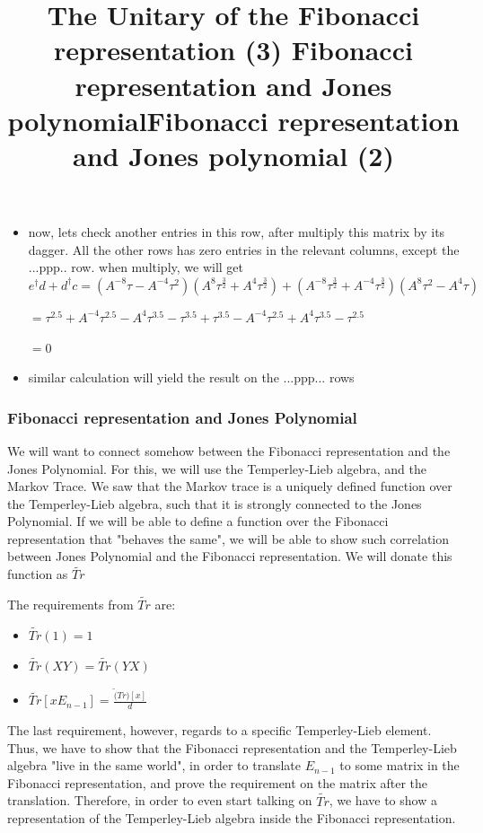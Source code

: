 \documentclass{article}
\begin{document}
\title{The Unitary of the Fibonacci representation (3) }
\begin{itemize}
\item  now, lets check another entries in this row, after multiply this matrix by its dagger.
All the other rows has zero entries in the relevant columns, except the ...ppp.. row. when multiply, we will get $e^{\dagger}d + d^{\dagger}c = (A^{-8}\tau - A^{-4}\tau^{2})(A^{8}\tau^{\frac{3}{2}} + A^{4}\tau^{\frac{3}{2}}) + (A^{-8}\tau^{\frac{3}{2}} + A^{-4}\tau^{\frac{3}{2}})(A^{8}\tau^{2} - A^{4}\tau)$

$ = \tau^{2.5} + A^{-4}\tau^{2.5} - A^{4}\tau^{3.5} - \tau^{3.5} + \tau^{3.5} - A^{-4}\tau^{2.5} + A^{4}\tau^{3.5} - \tau^{2.5}$

$ = 0$
\item similar calculation will yield the result on the ...ppp... rows   
\end{itemize}

\subsubsection{Fibonacci representation and Jones Polynomial}
\title{Fibonacci representation and Jones polynomial}
We will want to connect somehow between the Fibonacci representation and the Jones Polynomial.
For this, we will use the Temperley-Lieb algebra, and the Markov Trace. We saw that the Markov trace
is a uniquely defined function over the Temperley-Lieb algebra, such that it is strongly connected to the Jones Polynomial. If we will be able to define a function over the Fibonacci representation that "behaves the same", we will be able to show such correlation between Jones Polynomial and the Fibonacci representation. We will donate this function as $\tilde{Tr}$


\title{Fibonacci representation and Jones polynomial (2)}
The requirements from  $\tilde{Tr}$ are:
\begin{itemize}
\item $\tilde{Tr}(1) = 1$
\item $\tilde{Tr}(XY) = \tilde{Tr}(YX)$
\item  $ \tilde{Tr}[xE_{n-1}]=\frac{\tilde(Tr)[x]}{d}$    
\end{itemize}
The last requirement, however, regards to a specific Temperley-Lieb element. Thus, we have to show that the Fibonacci representation and the Temperley-Lieb algebra "live in the same world", in order to translate $E_{n-1}$ to some matrix in the Fibonacci representation, and prove the requirement on the matrix after the translation. Therefore, in order to even start talking on $\tilde{Tr}$, we have to show a representation of the Temperley-Lieb algebra inside the Fibonacci representation.  
\end{document}
